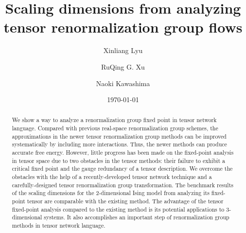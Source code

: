 \documentclass[aps,prb,reprint,superscriptaddress,floatfix]{revtex4-2}
\begin{document}

\title{Scaling dimensions from analyzing tensor renormalization group
flows}


\author{Xinliang Lyu} 
 \author{RuQing G. Xu}
 \author{Naoki Kawashima}
     



\date{\today}

\begin{abstract} We show a way to analyze a renormalization group fixed
    point in tensor network language. Compared with previous real-space
    renormalization group schemes, the approximations in the newer
    tensor renormalization group methods can be improved systematically
    by including more interactions. Thus, the newer methods can produce
    accurate free energy.  However, little progress has been made on the
    fixed-point analysis in tensor space due to two obstacles in the
    tensor methods: their failure to exhibit a critical fixed point and
    the gauge redundancy of a tensor description. We overcome the
    obstacles with the help of a recently-developed tensor network
    technique and a carefully-designed tensor renormalization group
    transformation. The benchmark results of the scaling dimensions for
    the 2-dimensional Ising model from analyzing its fixed-point tensor
    are comparable with the existing method. The advantage of the tensor
    fixed-point analysis compared to the existing method is its
    potential applications to 3-dimensional systems. It also
    accomplishes an important step of renormalization group methods in
    tensor network language.  
%
\end{abstract}
\end{document}
